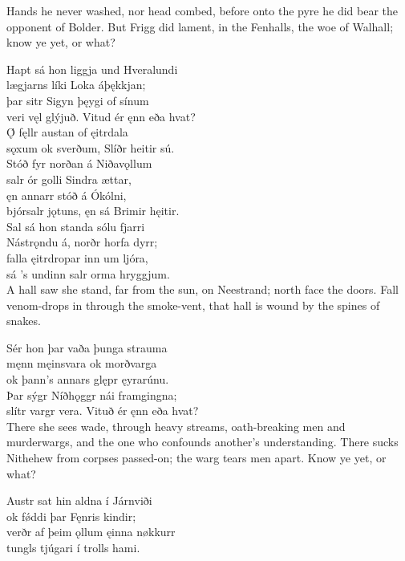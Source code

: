 \bvb Hands he never washed, nor head combed, before onto the pyre he did bear the opponent of Bolder. But Frigg did lament, in the Fenhalls, the woe of Walhall; know ye yet, or what?

\bva Hapt sá hon liggja \hld und Hveralundi \\%
lægjarns líki \hld Loka áþękkjan; \\%
þar sitr Sigyn \hld þęygi of sínum \\%
veri vęl glýjuð. \hld Vitud ér ęnn eða hvat?\\%

\bva Ǫ́ fęllr austan \hld of ęitrdala \\%
sǫxum ok sverðum, \hld Slíðr heitir sú.\\%

\bva Stóð fyr norðan \hld á Niðavǫllum \\%
salr ór golli \hld Sindra ættar, \\%
ęn annarr stóð \hld á Ókólni, \\%
bjórsalr jǫtuns, \hld ęn sá Brimir hęitir.\\%

\bva Sal sá hon standa \hld sólu fjarri \\%
Nástrǫndu á, \hld norðr horfa dyrr; \\%
falla ęitrdropar \hld inn um ljóra, \\%
sá ’s undinn salr \hld orma hryggjum.\\%

\bvb A hall saw she stand, far from the sun, on Neestrand; north face the doors. Fall venom-drops in through the smoke-vent, that hall is wound by the spines of snakes.

\bva Sér hon þar vaða \hld þunga strauma \\%
męnn męinsvara \hld ok morðvarga \\%
ok þann’s annars glępr \hld ęyrarúnu. \\%
Þar sýgr Níðhǫggr \hld nái framgingna; \\%
slítr vargr vera. \hld Vituð ér ęnn eða hvat?\\%

\bvb There she sees wade, through heavy streams, oath-breaking men and murderwargs, and the one who confounds another’s understanding\footnotemark[1]. There sucks Nithehew from corpses passed-on; the warg tears men apart. Know ye yet, or what?

\bva Austr sat hin aldna \hld í Járnviði \\%
ok fǿddi þar \hld Fęnris kindir; \\%
verðr af þeim ǫllum \hld ęinna nøkkurr \\%
tungls tjúgari \hld í trolls hami.\\%

